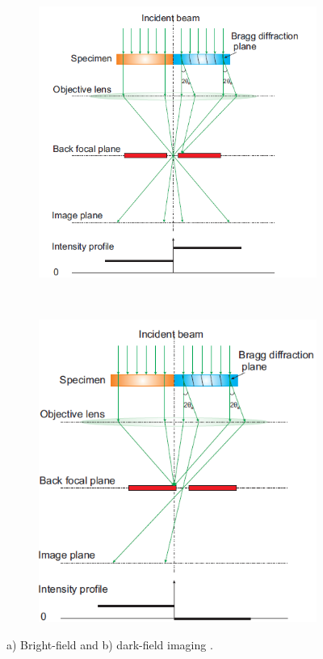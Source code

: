 \begin{figure}[h]
	\begin{subfigure}[t]{0.5\textwidth}
		\centering
		\includegraphics[width = 1\textwidth]{Figs/Ch2/bf.png}
		\caption{}
	\end{subfigure}%
	\hspace*{1cm}
	~	
	\begin{subfigure}[t]{0.44\textwidth}
		\centering
		\includegraphics[width=1\textwidth]{Figs/Ch2/df.png}
		\caption{}
	\end{subfigure}
	\caption {a) Bright-field and b) dark-field imaging \cite{Zhang2008}.}
	\label{bfdf}
\end{figure}
\FloatBarrier 


